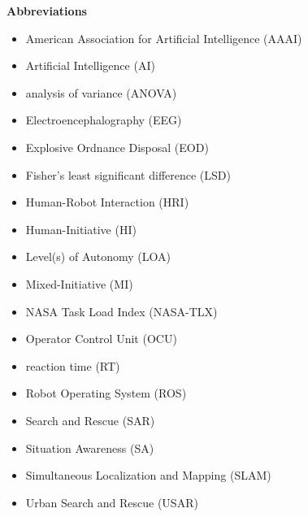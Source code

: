 \ifdefined\build\else\fi 

\begin{center}
\textbf{Abbreviations}
\end{center}

\begin{itemize}
	\item American Association for Artificial Intelligence (AAAI)
	\item Artificial Intelligence (AI) 
	\item analysis of variance (ANOVA)
	\item Electroencephalography (EEG)
	\item Explosive Ordnance Disposal (EOD)
	\item Fisher's least significant difference (LSD)
	\item Human-Robot Interaction (HRI)
	\item Human-Initiative (HI)
	\item Level(s) of Autonomy (LOA)
	\item Mixed-Initiative (MI)
	\item NASA Task Load Index (NASA-TLX) 
	\item Operator Control Unit (OCU) 
	\item reaction time (RT)
	\item Robot Operating System (ROS)  
	\item Search and Rescue (SAR)
	\item Situation Awareness (SA)
	\item Simultaneous Localization and Mapping (SLAM) 
	\item Urban Search and Rescue (USAR)
\end{itemize}	

\ifdefined\build\else\fi
